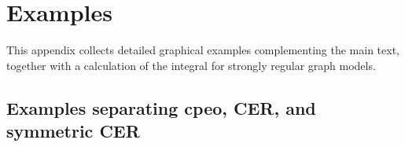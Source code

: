 \documentclass[12pt]{amsart}
\theoremstyle{plain}
\theoremstyle{definition}
\theoremstyle{remark}
\newcommand{\1}{\mathbf{1}}
\begin{document}













\appendix



\section{Examples}\label{app:graphical-examples}

This appendix collects detailed graphical examples complementing the main text,
together with a calculation of the integral for strongly regular graph models.

\subsection{Examples separating cpeo, CER, and symmetric CER}
\label{subsec:three-levels}
\end{document}
